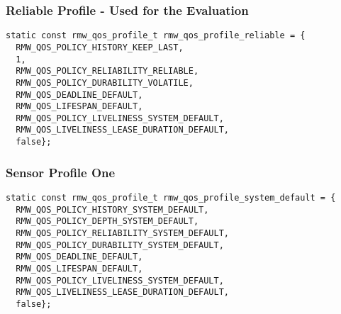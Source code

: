 \subsubsection*{Reliable Profile - Used for the Evaluation}
\begin{lstlisting}[caption=Reliable profile.,label=ca_code_qos_reliable]
static const rmw_qos_profile_t rmw_qos_profile_reliable = {
  RMW_QOS_POLICY_HISTORY_KEEP_LAST,
  1,
  RMW_QOS_POLICY_RELIABILITY_RELIABLE,
  RMW_QOS_POLICY_DURABILITY_VOLATILE,
  RMW_QOS_DEADLINE_DEFAULT,
  RMW_QOS_LIFESPAN_DEFAULT,
  RMW_QOS_POLICY_LIVELINESS_SYSTEM_DEFAULT,
  RMW_QOS_LIVELINESS_LEASE_DURATION_DEFAULT,
  false};
\end{lstlisting}
\subsubsection*{Sensor Profile One}
\begin{lstlisting}[caption=System default profile.,label=ca_code_qos_system_default]
static const rmw_qos_profile_t rmw_qos_profile_system_default = {
  RMW_QOS_POLICY_HISTORY_SYSTEM_DEFAULT,
  RMW_QOS_POLICY_DEPTH_SYSTEM_DEFAULT,
  RMW_QOS_POLICY_RELIABILITY_SYSTEM_DEFAULT,
  RMW_QOS_POLICY_DURABILITY_SYSTEM_DEFAULT,
  RMW_QOS_DEADLINE_DEFAULT,
  RMW_QOS_LIFESPAN_DEFAULT,
  RMW_QOS_POLICY_LIVELINESS_SYSTEM_DEFAULT,
  RMW_QOS_LIVELINESS_LEASE_DURATION_DEFAULT,
  false};
\end{lstlisting}

